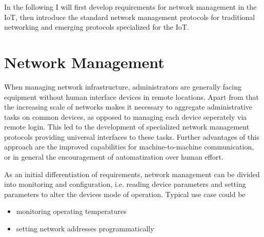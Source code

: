 \documentclass[conference]{IEEEtran}
\begin{document}
  In the following I will first develop requirements for network management in the IoT, then introduce the standard network management protocols for traditional networking and emerging protocols specialized for the IoT.

\section{Network Management} %
\label{sub:network_management_in_general}

  When managing network infrastructure, administrators are generally facing equipment without human interface devices in remote locations. Apart from that the increasing scale of networks makes it necessary to aggregate administrative tasks on common devices, as opposed to managing each device seperately via remote login. This led to the development of specialized network management protocols providing universal interfaces to these tasks. Further advantages of this approach are the improved capabilities for machine-to-machine communication, or in general the encouragement of automatization over human effort.

  As an initial differentiation of requirements, network management can be divided into monitoring and configuration, i.e. reading device parameters and setting parameters to alter the devices mode of operation. Typical use case could be

  \begin{itemize}
    \item monitoring operating temperatures
    \item setting network addresses programmatically
  \end{itemize}
\end{document}
